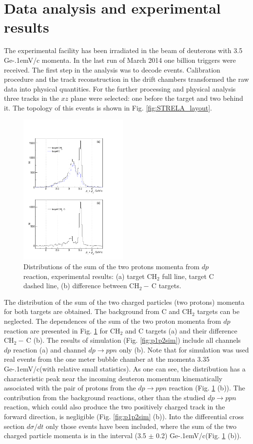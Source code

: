 \documentclass[twocolumn,epjc3]{svjour3}
\newcommand{\dpfrag} {\ensuremath{dp \rightarrow ppn}\xspace}
\newcommand{\dpchex} {\ensuremath{dp \rightarrow (pp)n}\xspace}
\newcommand{\GeVc}   {Ge\kern-.1emV/c\xspace}
\begin{document}
\section{Data analysis and experimental results}
The experimental facility has been irradiated in the beam of deuterons with 3.5
\GeVc momenta. In the last run of March 2014 one billion triggers were received.
The first step in the analysis was to decode events. Calibration procedure and
the track reconstruction in the drift chambers transformed the raw data into
physical quantities. For the further processing and physical analysis three
tracks in the $xz$ plane were selected: one before the target and two behind it.
The topology of this events is shown in Fig. \ref{fig:STRELA_layout}.

\begin{figure}[h]
  \centering
  \includegraphics[width=0.48\textwidth]{p1_plus_p2_1.pdf}
  \caption{Distributions of the sum of the two protons momenta from $dp$
    reaction, experimental results: (a) target CH$_2$ full line, target C dashed
    line, (b) difference between CH$_2-$\,C targets.}
  \label{fig:p1p2exp}
\end{figure}

The distribution of the sum of the two charged particles (two protons) momenta
for both targets are obtained. The background from C and CH$_2$ targets can be
neglected. The dependences of the sum of the two proton momenta from $dp$
reaction are presented in Fig. \ref{fig:p1p2exp} for CH$_2$ and C targets (a)
and their difference CH$_2-\,$C (b). The results of simulation
(Fig. \ref{fig:p1p2sim}) include all channels $dp$ reaction (a) and channel
\dpfrag only (b). Note that for simulation was used real events from the one
meter bubble chamber at the momenta 3.35 \GeVc (with relative small statistics).
As one can see, the distribution has a characteristic peak near the incoming
deuteron momentum kinematically associated with the pair of protons from the
\dpfrag reaction (Fig. \ref{fig:p1p2exp} (b)). The contribution from the
background reactions, other than the studied \dpfrag reaction, which could also
produce the two positively charged track in the forward direction, is negligible
(Fig. \ref{fig:p1p2sim} (b)). Into the differential cross section $d\sigma/dt$
only those events have been included, where the sum of the two charged particle
momenta is in the interval (3.5 $\pm$ 0.2) \GeVc (Fig. \ref{fig:p1p2exp} (b)).
\end{document}
